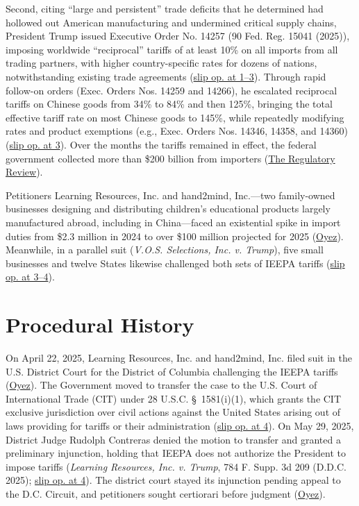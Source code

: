 \documentclass[12pt]{article}
\begin{document}
Second, citing ``large and persistent'' trade deficits that he determined had hollowed out American manufacturing and undermined critical supply chains, President Trump issued Executive Order No. 14257 (90 Fed. Reg. 15041 (2025)), imposing worldwide ``reciprocal'' tariffs of at least 10\% on all imports from all trading partners, with higher country-specific rates for dozens of nations, notwithstanding existing trade agreements (\href{https://www.law.cornell.edu/supremecourt/text/24-1287}{slip op. at 1--3}). Through rapid follow-on orders (Exec. Orders Nos. 14259 and 14266), he escalated reciprocal tariffs on Chinese goods from 34\% to 84\% and then 125\%, bringing the total effective tariff rate on most Chinese goods to 145\%, while repeatedly modifying rates and product exemptions (e.g., Exec. Orders Nos. 14346, 14358, and 14360) (\href{https://www.law.cornell.edu/supremecourt/text/24-1287}{slip op. at 3}). Over the months the tariffs remained in effect, the federal government collected more than \$200 billion from importers (\href{https://www.theregreview.org/2026/07/24/levin-the-tariff-case-and-the-major-questions-doctrine/}{The Regulatory Review}).

Petitioners Learning Resources, Inc. and hand2mind, Inc.---two family-owned businesses designing and distributing children's educational products largely manufactured abroad, including in China---faced an existential spike in import duties from \$2.3 million in 2024 to over \$100 million projected for 2025 (\href{https://www.oyez.org/cases/2025/24-1287}{Oyez}). Meanwhile, in a parallel suit (\textit{V.O.S. Selections, Inc. v. Trump}), five small businesses and twelve States likewise challenged both sets of IEEPA tariffs (\href{https://www.law.cornell.edu/supremecourt/text/24-1287}{slip op. at 3--4}).

\section{Procedural History}
On April 22, 2025, Learning Resources, Inc. and hand2mind, Inc. filed suit in the U.S. District Court for the District of Columbia challenging the IEEPA tariffs (\href{https://www.oyez.org/cases/2025/24-1287}{Oyez}). The Government moved to transfer the case to the U.S. Court of International Trade (CIT) under 28 U.S.C. \S~1581(i)(1), which grants the CIT exclusive jurisdiction over civil actions against the United States arising out of laws providing for tariffs or their administration (\href{https://www.law.cornell.edu/supremecourt/text/24-1287}{slip op. at 4}). On May 29, 2025, District Judge Rudolph Contreras denied the motion to transfer and granted a preliminary injunction, holding that IEEPA does not authorize the President to impose tariffs (\textit{Learning Resources, Inc. v. Trump}, 784 F. Supp. 3d 209 (D.D.C. 2025); \href{https://www.law.cornell.edu/supremecourt/text/24-1287}{slip op. at 4}). The district court stayed its injunction pending appeal to the D.C. Circuit, and petitioners sought certiorari before judgment (\href{https://www.oyez.org/cases/2025/24-1287}{Oyez}).
\end{document}
